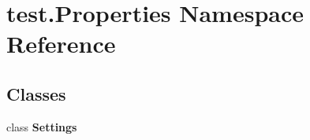 \hypertarget{namespacetest_1_1_properties}{}\section{test.\+Properties Namespace Reference}
\label{namespacetest_1_1_properties}
\subsection*{Classes}
\begin{DoxyCompactItemize}
\item 
class {\bfseries Settings}
\end{DoxyCompactItemize}
